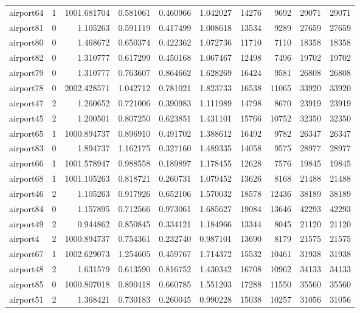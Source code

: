 \begin{longtable}{|l|r|r|r|r|r|r|r|r|r|}
airport64 & 1 & 1001.681704 & 0.581061 & 0.460966 & 1.042027 & 14276 & 9692 & 29071 & 29071 \\
airport81 & 0 & 1.105263 & 0.591119 & 0.417499 & 1.008618 & 13534 & 9289 & 27659 & 27659 \\
airport80 & 0 & 1.468672 & 0.650374 & 0.422362 & 1.072736 & 11710 & 7110 & 18358 & 18358 \\
airport82 & 0 & 1.310777 & 0.617299 & 0.450168 & 1.067467 & 12498 & 7496 & 19702 & 19702 \\
airport79 & 0 & 1.310777 & 0.763607 & 0.864662 & 1.628269 & 16424 & 9581 & 26808 & 26808 \\
airport78 & 0 & 2002.428571 & 1.042712 & 0.781021 & 1.823733 & 16538 & 11065 & 33920 & 33920 \\
airport47 & 2 & 1.260652 & 0.721006 & 0.390983 & 1.111989 & 14798 & 8670 & 23919 & 23919 \\
airport45 & 2 & 1.200501 & 0.807250 & 0.623851 & 1.431101 & 15766 & 10752 & 32350 & 32350 \\
airport65 & 1 & 1000.894737 & 0.896910 & 0.491702 & 1.388612 & 16492 & 9782 & 26347 & 26347 \\
airport83 & 0 & 1.894737 & 1.162175 & 0.327160 & 1.489335 & 14058 & 9575 & 28977 & 28977 \\
airport66 & 1 & 1001.578947 & 0.988558 & 0.189897 & 1.178455 & 12628 & 7576 & 19845 & 19845 \\
airport68 & 1 & 1001.105263 & 0.818721 & 0.260731 & 1.079452 & 13626 & 8168 & 21488 & 21488 \\
airport46 & 2 & 1.105263 & 0.917926 & 0.652106 & 1.570032 & 18578 & 12436 & 38189 & 38189 \\
airport84 & 0 & 1.157895 & 0.712566 & 0.973061 & 1.685627 & 19084 & 13646 & 42293 & 42293 \\
airport49 & 2 & 0.944862 & 0.850845 & 0.334121 & 1.184966 & 13344 & 8045 & 21120 & 21120 \\
airport4 & 2 & 1000.894737 & 0.754361 & 0.232740 & 0.987101 & 13690 & 8179 & 21575 & 21575 \\
airport67 & 1 & 1002.629073 & 1.254605 & 0.459767 & 1.714372 & 15532 & 10461 & 31938 & 31938 \\
airport48 & 2 & 1.631579 & 0.613590 & 0.816752 & 1.430342 & 16708 & 10962 & 34133 & 34133 \\
airport85 & 0 & 1000.807018 & 0.890418 & 0.660785 & 1.551203 & 17288 & 11550 & 35560 & 35560 \\
airport51 & 2 & 1.368421 & 0.730183 & 0.260045 & 0.990228 & 15038 & 10257 & 31056 & 31056 \\

\end{longtable}
